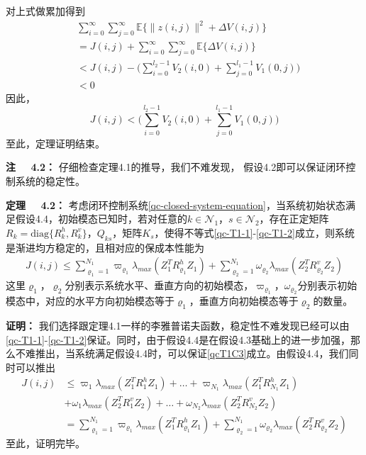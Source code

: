	对上式做累加得到
	\begin{equation}
	\begin{split}
	&\sum_{i=0}^{\infty}\sum_{j=0}^{\infty}\mathbb{E}\{\|z(i,j)\|^{2}+\varDelta V(i,j) \}\\&=J(i,j)+\sum_{i=0}^{\infty}\sum_{j=0}^{\infty}\mathbb{E}\{\varDelta V(i,j) \}\\
	&<J(i,j)-\big( \sum_{i=0}^{l_2-1}V_2(i,0) + \sum_{j=0}^{l_1-1}V_{1}(0,j)\big)\\&<0
	\end{split}
	\end{equation}
	因此，
	\begin{equation}
		J(i,j)<\big( \sum_{i=0}^{l_2-1}V_2(i,0) + \sum_{j=0}^{l_1-1}V_{1}(0,j)\big)
	\end{equation}
	至此，定理证明结束。
	
	{\bf 注 \ \ 4.2：}
	仔细检查定理4.1的推导，我们不难发现， 假设4.2即可以保证闭环控制系统的稳定性。


	{\bf 定理 \ \ 4.2：}
	考虑闭环控制系统\eqref{qc-closed-system-equation}，当系统初始状态满足假设4.4，初始模态已知时，若对任意的$k\in\mathcal{N}_{1}$，$s\in\mathcal{N}_2$，存在正定矩阵$R_{k}=\mathrm{diag}\{R^{h}_{k},R^{v}_{k}\}$，$Q_{ks}$，矩阵$K_{s}$，使得不等式\eqref{qc-T1-1}-\eqref{qc-T1-2}成立，则系统是渐进均方稳定的，且相对应的保成本性能为
	\begin{equation}\label{qcT2}
	\begin{split}
	J(i,j) \leq \sum_{\varrho_{1}=1}^{N_{1}}\varpi_{\varrho_{1}}\lambda_{max}(Z^{T}_{1}R^{h}_{\varrho_{1}}Z_{1})
	+\sum_{\varrho_{2}=1}^{N_{1}}\omega_{\varrho_{2}}\lambda_{max}(Z^{T}_{2}R^{v}_{\varrho_{2}}Z_{2})
	\end{split}
	\end{equation}
	这里$\varrho_{1}$，$\varrho_{2}$分别表示系统水平、垂直方向的初始模态，$\varpi_{\varrho_{1}}$，$\omega_{\varrho_{2}}$分别表示初始模态中，对应的水平方向初始模态等于$\varrho_{1}$，垂直方向初始模态等于$\varrho_{2}$的数量。
	
	{\bf 证明：} 
	我们选择跟定理4.1一样的李雅普诺夫函数，稳定性不难发现已经可以由\eqref{qc-T1-1}-\eqref{qc-T1-2}保证。同时，由于假设4.4是在假设4.3基础上的进一步加强，那么不难推出，当系统满足假设4.4时，可以保证\eqref{qcT1C3}成立。由假设4.4，我们同时可以推出
	\begin{equation}
		\begin{split}
			J(i,j)&\leq \varpi_1\lambda_{max}(Z^{T}_{1}R^{h}_{1}Z_{1})+\dots+\varpi_{N_{1}}\lambda_{max}(Z^{T}_{1}R^{h}_{N_{1}}Z_{1}) \\ 
			&+\omega_{1}\lambda_{max}(Z^{T}_{2}R^{v}_{1}Z_{2})+\dots+\omega_{N_{2}}\lambda_{max}(Z^{T}_{2}R^{v}_{N_2}Z_{2})\\
			&=\sum_{\varrho_{1}=1}^{N_{1}}\varpi_{\varrho_{1}}\lambda_{max}(Z^{T}_{1}R^{h}_{\varrho_{1}}Z_{1})
			+\sum_{\varrho_{2}=1}^{N_{1}}\omega_{\varrho_{2}}\lambda_{max}(Z^{T}_{2}R^{v}_{\varrho_{2}}Z_{2})
		\end{split}
	\end{equation}
	至此，证明完毕。
	
